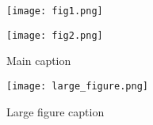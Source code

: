 \begin{figure}[!htbp]
    \centering
    \begin{minipage}{\textwidth}
        \centering
        \begin{minipage}[t]{0.48\textwidth}
            \centering
            \texttt{[image: fig1.png]}
        \end{minipage}
        \hfill
        \begin{minipage}[t]{0.48\textwidth}
            \centering
            \texttt{[image: fig2.png]}
        \end{minipage}
    \end{minipage}
    \caption{Main caption}
\end{figure}

\usepackage{pdflscape}
\begin{landscape}
    \begin{figure}[!htbp]
        \centering
        \texttt{[image: large\_figure.png]}
        \caption{Large figure caption}
    \end{figure}
\end{landscape}

\usepackage[draft]{graphicx}  %
\usepackage{showframe}        %



\raggedbottom

\renewcommand{\topfraction}{0.9}        %
\renewcommand{\bottomfraction}{0.8}     %
\renewcommand{\textfraction}{0.1}       %
\renewcommand{\floatpagefraction}{0.8}  %

\clearpage  %